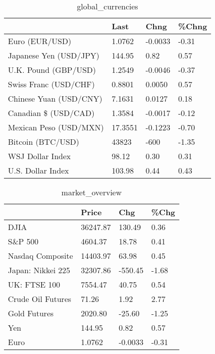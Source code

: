 \documentclass{article}%
\begin{document}
%


\begin{table}[htbp]%
\caption{global\_currencies}%
\centering%
\begin{adjustbox}{width=1\textwidth}%
\begin{tabular}{llll}
\toprule
                       &    Last &    Chng & \%Chng \\
\midrule
        Euro (EUR/USD) &  1.0762 & -0.0033 & -0.31 \\
Japanese Yen (USD/JPY) &  144.95 &    0.82 &  0.57 \\
  U.K. Pound (GBP/USD) &  1.2549 & -0.0046 & -0.37 \\
 Swiss Franc (USD/CHF) &  0.8801 &  0.0050 &  0.57 \\
Chinese Yuan (USD/CNY) &  7.1631 &  0.0127 &  0.18 \\
  Canadian \$ (USD/CAD) &  1.3584 & -0.0017 & -0.12 \\
Mexican Peso (USD/MXN) & 17.3551 & -0.1223 & -0.70 \\
     Bitcoin (BTC/USD) &   43823 &    -600 & -1.35 \\
      WSJ Dollar Index &   98.12 &    0.30 &  0.31 \\
     U.S. Dollar Index &  103.98 &    0.44 &  0.43 \\
\bottomrule
\end{tabular}
%
\end{adjustbox}%
\end{table}

%


\begin{table}[htbp]%
\caption{market\_overview}%
\centering%
\begin{adjustbox}{width=1\textwidth}%
\begin{tabular}{llll}
\toprule
                  &    Price &     Chg &  \%Chg \\
\midrule
             DJIA & 36247.87 &  130.49 &  0.36 \\
          S\&P 500 &  4604.37 &   18.78 &  0.41 \\
 Nasdaq Composite & 14403.97 &   63.98 &  0.45 \\
Japan: Nikkei 225 & 32307.86 & -550.45 & -1.68 \\
     UK: FTSE 100 &  7554.47 &   40.75 &  0.54 \\
Crude Oil Futures &    71.26 &    1.92 &  2.77 \\
     Gold Futures &  2020.80 &  -25.60 & -1.25 \\
              Yen &   144.95 &    0.82 &  0.57 \\
             Euro &   1.0762 & -0.0033 & -0.31 \\
\bottomrule
\end{tabular}
%
\end{adjustbox}%
\end{table}

%
\end{document}
